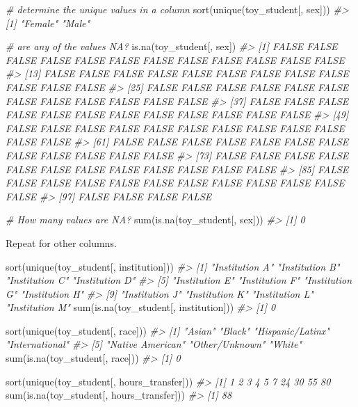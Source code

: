 \documentclass[
]{book}
\newenvironment{Shaded}{\begin{snugshade}}{\end{snugshade}}
\newcommand{\CommentTok}[1]{\textcolor[rgb]{0.56,0.35,0.01}{\textit{#1}}}
\newcommand{\FunctionTok}[1]{\textcolor[rgb]{0.00,0.00,0.00}{#1}}
\newcommand{\NormalTok}[1]{#1}
\begin{document}
\begin{Shaded}
\begin{Highlighting}[]
\CommentTok{\# determine the unique values in a column }
\FunctionTok{sort}\NormalTok{(}\FunctionTok{unique}\NormalTok{(toy\_student[, sex]))}
\CommentTok{\#\textgreater{} [1] "Female" "Male"}

\CommentTok{\# are any of the values NA?}
\FunctionTok{is.na}\NormalTok{(toy\_student[, sex])}
\CommentTok{\#\textgreater{}   [1] FALSE FALSE FALSE FALSE FALSE FALSE FALSE FALSE FALSE FALSE FALSE FALSE}
\CommentTok{\#\textgreater{}  [13] FALSE FALSE FALSE FALSE FALSE FALSE FALSE FALSE FALSE FALSE FALSE FALSE}
\CommentTok{\#\textgreater{}  [25] FALSE FALSE FALSE FALSE FALSE FALSE FALSE FALSE FALSE FALSE FALSE FALSE}
\CommentTok{\#\textgreater{}  [37] FALSE FALSE FALSE FALSE FALSE FALSE FALSE FALSE FALSE FALSE FALSE FALSE}
\CommentTok{\#\textgreater{}  [49] FALSE FALSE FALSE FALSE FALSE FALSE FALSE FALSE FALSE FALSE FALSE FALSE}
\CommentTok{\#\textgreater{}  [61] FALSE FALSE FALSE FALSE FALSE FALSE FALSE FALSE FALSE FALSE FALSE FALSE}
\CommentTok{\#\textgreater{}  [73] FALSE FALSE FALSE FALSE FALSE FALSE FALSE FALSE FALSE FALSE FALSE FALSE}
\CommentTok{\#\textgreater{}  [85] FALSE FALSE FALSE FALSE FALSE FALSE FALSE FALSE FALSE FALSE FALSE FALSE}
\CommentTok{\#\textgreater{}  [97] FALSE FALSE FALSE FALSE}

\CommentTok{\# How many values are NA?}
\FunctionTok{sum}\NormalTok{(}\FunctionTok{is.na}\NormalTok{(toy\_student[, sex]))}
\CommentTok{\#\textgreater{} [1] 0}
\end{Highlighting}
\end{Shaded}

Repeat for other columns.

\begin{Shaded}
\begin{Highlighting}[]
\FunctionTok{sort}\NormalTok{(}\FunctionTok{unique}\NormalTok{(toy\_student[, institution]))}
\CommentTok{\#\textgreater{}  [1] "Institution A" "Institution B" "Institution C" "Institution D"}
\CommentTok{\#\textgreater{}  [5] "Institution E" "Institution F" "Institution G" "Institution H"}
\CommentTok{\#\textgreater{}  [9] "Institution J" "Institution K" "Institution L" "Institution M"}
\FunctionTok{sum}\NormalTok{(}\FunctionTok{is.na}\NormalTok{(toy\_student[, institution]))}
\CommentTok{\#\textgreater{} [1] 0}

\FunctionTok{sort}\NormalTok{(}\FunctionTok{unique}\NormalTok{(toy\_student[, race]))}
\CommentTok{\#\textgreater{} [1] "Asian"           "Black"           "Hispanic/Latinx" "International"  }
\CommentTok{\#\textgreater{} [5] "Native American" "Other/Unknown"   "White"}
\FunctionTok{sum}\NormalTok{(}\FunctionTok{is.na}\NormalTok{(toy\_student[, race]))}
\CommentTok{\#\textgreater{} [1] 0}

\FunctionTok{sort}\NormalTok{(}\FunctionTok{unique}\NormalTok{(toy\_student[, hours\_transfer]))}
\CommentTok{\#\textgreater{}  [1]  1  2  3  4  5  7 24 30 55 80}
\FunctionTok{sum}\NormalTok{(}\FunctionTok{is.na}\NormalTok{(toy\_student[, hours\_transfer]))}
\CommentTok{\#\textgreater{} [1] 88}
\end{Highlighting}
\end{Shaded}
\end{document}
